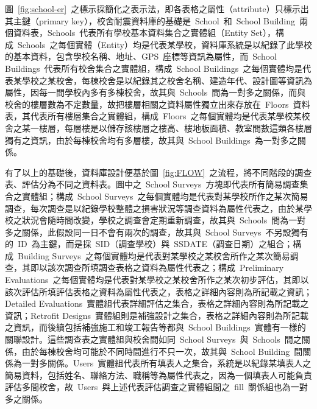 圖~\ref{fig:school-er}~之標示採簡化之表示法，即各表格之屬性（attribute）只標示出其主鍵（primary key），校舍耐震資料庫的基礎是~School~和~School Building~兩個資料表，Schools~代表所有學校基本資料集合之實體組（Entity Set），構成~Schools~之每個實體（Entity）均是代表某學校，資料庫系統是以紀錄了此學校的基本資料，包含學校名稱、地址、GPS~座標等資訊為屬性，而~School Buildings~代表所有校舍集合之實體組，構成~School Buildings~之每個實體均是代表某學校之某校舍，每棟校舍是以紀錄其之校舍名稱、建造年代、設計圖等資訊為屬性，因每一間學校內多有多棟校舍，故其與~Schools~間為一對多之關係，而與校舍的樓層數為不定數量，故把樓層相關之資料屬性獨立出來存放在~Floors~資料表，其代表所有樓層集合之實體組，構成~Floors~之每個實體均是代表某學校某校舍之某一樓層，每層樓是以儲存該樓層之樓高、樓地板面積、教室間數這類各樓層獨有之資訊，由於每棟校舍均有多層樓，故其與~School Buildings~為一對多之關係。

有了以上的基礎後，資料庫設計便基於圖~\ref{fig:FLOW}~之流程，將不同階段的調查表、評估分為不同之資料表。圖中之~School Surveys~方塊即代表所有簡易調查集合之實體組；構成~School Surveys~之每個實體均是代表對某學校所作之某次簡易調查，每次調查是以紀錄學校整體之損害狀況等調查資料為屬性代表之，由於某學校之狀況會隨時間改變，學校之調查會定期重新調查，故其與~Schools~間為一對多之關係，此假設同一日不會有兩次的調查，故其與~School Surveys~不另設獨有的~ID~為主鍵，而是採~SID（調查學校）與~SSDATE（調查日期）之組合；構成~Building Surveys~之每個實體均是代表對某學校之某校舍所作之某次簡易調查，其即以該次調查所填調查表格之資料為屬性代表之；構成~Preliminary Evaluations~之每個實體均是代表對某學校之某校舍所作之某次初步評估，其即以該次評估所填評估表格之資料為屬性代表之，表格之詳細內容則為所記載之資訊；Detailed Evaluations~實體組代表詳細評估之集合，表格之詳細內容則為所記載之資訊；Retrofit Designs~實體組則是補強設計之集合，表格之詳細內容則為所記載之資訊，而後續包括補強施工和竣工報告等都與~School Buildings~實體有一樣的關聯設計。這些調查表之實體組與校舍間如同~School Surveys~與~Schools~間之關係，由於每棟校舍均可能於不同時間進行不只一次，故其與~School Building~間關係為一對多關係。Users~實體組代表所有填表人之集合，系統是以紀錄某填表人之簡易資料，包括姓名、聯絡方法、職稱等為屬性代表之，因為一個填表人可能負責評估多間校舍，故~Users~與上述代表評估調查之實體組間之~fill~關係組也為一對多之關係。







